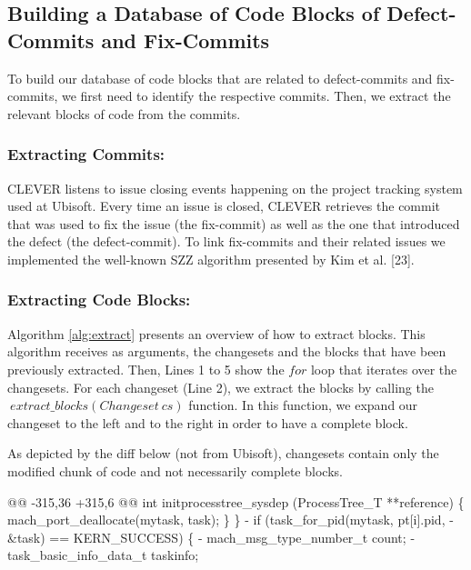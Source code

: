 \documentclass[sigconf]{acmart}
\newenvironment{Shaded}{}{}
\newcommand{\DataTypeTok}[1]{\textcolor[rgb]{0.56,0.13,0.00}{{#1}}}
\newcommand{\StringTok}[1]{\textcolor[rgb]{0.25,0.44,0.63}{{#1}}}
\newcommand{\NormalTok}[1]{{#1}}
\begin{document}
\subsection{Building a Database of Code Blocks of Defect-Commits and
Fix-Commits}\label{sec:offline}

To build our database of code blocks that are related to defect-commits
and fix-commits, we first need to identify the respective commits. Then,
we extract the relevant blocks of code from the commits.

\subsubsection{Extracting Commits:}\label{extracting-commits}

CLEVER listens to issue closing events happening on the project tracking
system used at Ubisoft. Every time an issue is closed, CLEVER retrieves
the commit that was used to fix the issue (the fix-commit) as well as
the one that introduced the defect (the defect-commit). To link
fix-commits and their related issues we implemented the well-known SZZ
algorithm presented by Kim et al. [23].

\subsubsection{Extracting Code Blocks:}\label{extracting-code-blocks}

Algorithm \ref{alg:extract} presents an overview of how to extract
blocks. This algorithm receives as arguments, the changesets and the
blocks that have been previously extracted. Then, Lines 1 to 5 show the
\(for\) loop that iterates over the changesets. For each changeset (Line
2), we extract the blocks by calling the
\(~extract\_blocks(Changeset~cs)\) function. In this function, we expand
our changeset to the left and to the right in order to have a complete
block.



As depicted by the diff below (not from Ubisoft), changesets contain
only the modified chunk of code and not necessarily complete blocks.

\begin{Shaded}
\begin{Highlighting}[]
\DataTypeTok{@@ -315,36 +315,6 @@}
\NormalTok{int initprocesstree_sysdep}
\NormalTok{(ProcessTree_T **reference) \{}
    \NormalTok{mach_port_deallocate(mytask,}
      \NormalTok{task);}
\NormalTok{\}}
\NormalTok{\}}
\StringTok{- if (task_for_pid(mytask, pt[i].pid,}
\StringTok{-  &task) == KERN_SUCCESS) \{}
\StringTok{-   mach_msg_type_number_t   count;}
\StringTok{-   task_basic_info_data_t   taskinfo;}
\end{Highlighting}
\end{Shaded}
\end{document}
